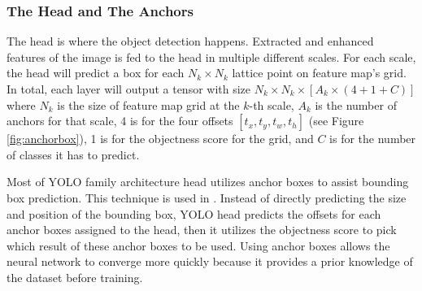   
 

  
    \subsubsection{The Head and The Anchors}

    The head is where the object detection happens. Extracted and enhanced features of the image is fed to the head 
    in multiple different scales. For each scale, the head will predict a box for each $N_k \times N_k$
    lattice point on feature map's grid. In total, each layer will output a tensor with size
    $N_k \times N_k \times [A_k \times (4+1+C)]$ where $N_k$ is the size of feature map grid at the $k$-th scale,
    $A_k$ is the number of anchors for that scale, 4 is for the four offsets $[t_x, t_y, t_w, t_h]$ (see Figure 
    \ref{fig:anchorbox}), 1 is for the objectness score for the grid, and $C$ is for the number of classes it has
    to predict.
    
    Most of YOLO family architecture head utilizes anchor boxes to assist bounding box prediction.
    This technique is used in \textcites{yolov2}{yolov3}{yolov4}{scaledyolov4}{yolov5}{yolor}{yolov7}.
    Instead of directly predicting the size and position of the bounding box, YOLO head predicts 
    the offsets for each anchor boxes assigned to the head, then it utilizes the objectness score to pick
    which result  of these anchor boxes to be used.
    Using anchor boxes allows the neural network to converge more quickly because it provides
    a prior knowledge of the dataset before training.
    
